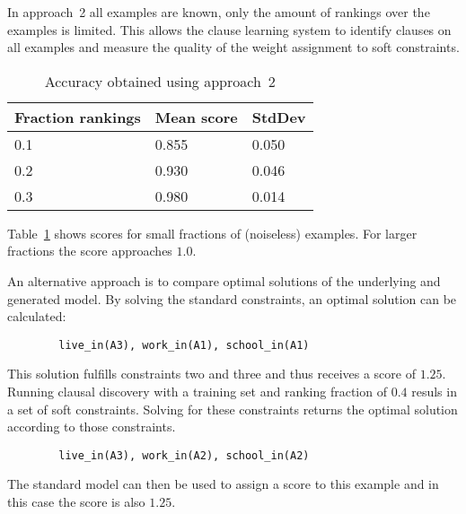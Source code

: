 \begin{experiment}

		In approach~2 all examples are known, only the amount of rankings over the examples is limited.
		This allows the clause learning system to identify clauses on all examples and measure the quality of the weight assignment to soft constraints.

		\begin{table}[!htp]
		\begin{tabularx}{\textwidth}{XXX}
			\textbf{Fraction rankings}	& \textbf{Mean score}	& \textbf{StdDev} \\
			\toprule
			0.1 	& 0.855		& 0.050 \\
			0.2 	& 0.930		& 0.046 \\
			0.3 	& 0.980 	& 0.014 \\
		\end{tabularx}
		\label{tbl:exp_acc_approach2}
		\caption{Accuracy obtained using approach~2}

		Table~\ref{tbl:exp_acc_approach2} shows scores for small fractions of (noiseless) examples.
		For larger fractions the score approaches $1.0$.
	\end{table}

\end{experiment}

\begin{experiment}
	An alternative approach is to compare optimal solutions of the underlying and generated model.
	By solving the standard constraints, an optimal solution can be calculated:
	\begin{verbatim}
		live_in(A3), work_in(A1), school_in(A1)
	\end{verbatim}
	This solution fulfills constraints two and three and thus receives a score of $1.25$.
	Running clausal discovery with a training set and ranking fraction of $0.4$ resuls in a set of soft constraints.
	Solving for these constraints returns the optimal solution according to those constraints.
	\begin{verbatim}
		live_in(A3), work_in(A2), school_in(A2)
	\end{verbatim}
	The standard model can then be used to assign a score to this example and in this case the score is also $1.25$.
\end{experiment}

